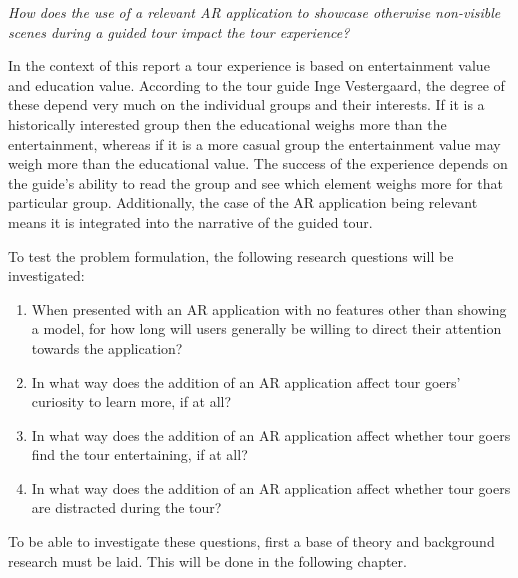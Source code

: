 \begin{displayquote}\textit{How does the use of a relevant AR application to showcase otherwise non-visible scenes during a guided tour impact the tour experience?}\end{displayquote}

In the context of this report a tour experience is based on entertainment value and education value. According to the tour guide Inge Vestergaard, the degree of these depend very much on the individual groups and their interests. If it is a historically interested group then the educational weighs more than the entertainment, whereas if it is a more casual group the entertainment value may weigh more than the educational value. The success of the experience depends on the guide’s ability to read the group and see which element weighs more for that particular group. Additionally, the case of the AR application being relevant means it is integrated into the narrative of the guided tour.

To test the problem formulation, the following research questions will be investigated: 

\begin{enumerate}
\item When presented with an AR application with no features other than showing a model, for how long will users generally be willing to direct their attention towards the application?
\item In what way does the addition of an AR application affect tour goers’ curiosity to learn more, if at all?
\item In what way does the addition of an AR application affect whether tour goers find the tour entertaining, if at all?
\item In what way does the addition of an AR application affect whether tour goers are distracted during the tour?
\end{enumerate}


To be able to investigate these questions, first a base of theory and background research must be laid. This will be done in the following chapter. 